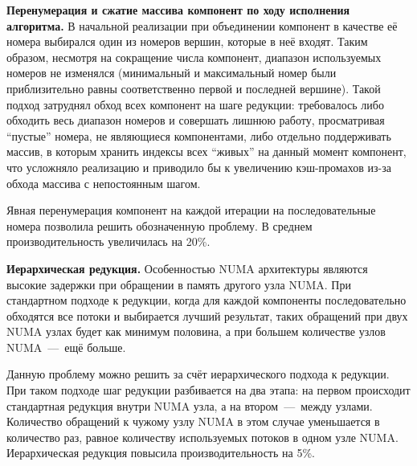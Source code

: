 \documentclass[a4paper,10pt]{extarticle}
\begin{document}
\textbf{Перенумерация и сжатие массива компонент по ходу исполнения алгоритма.}
В начальной реализации при объединении компонент в качестве её номера выбирался один из номеров вершин, которые в неё входят. Таким образом, несмотря на сокращение числа компонент, диапазон используемых номеров не изменялся (минимальный и максимальный номер были приблизительно равны соответственно первой и последней вершине). Такой подход затруднял обход всех компонент на шаге редукции: требовалось либо обходить весь диапазон номеров и совершать лишнюю работу, просматривая ``пустые'' номера, не являющиеся компонентами, либо отдельно поддерживать массив, в которым хранить индексы всех ``живых'' на данный момент компонент, что усложняло реализацию и приводило бы к увеличению кэш-промахов из-за обхода массива с непостоянным шагом.

Явная перенумерация компонент на каждой итерации на последовательные номера позволила решить обозначенную проблему. В среднем производительность увеличилась на 20\%.


\textbf{Иерархическая редукция.}
Особенностью NUMA архитектуры являются высокие задержки при обращении в память другого узла NUMA.
При стандартном подходе к редукции, когда для каждой компоненты последовательно обходятся все потоки и выбирается лучший результат, таких обращений при двух NUMA узлах будет как минимум половина, а при большем количестве узлов NUMA~---~ещё больше. 

Данную проблему можно решить за счёт иерархического подхода к редукции. При таком подходе шаг редукции разбивается на два этапа: на первом происходит стандартная редукция внутри NUMA узла, а на втором~---~между узлами. Количество обращений к чужому узлу NUMA в этом случае уменьшается в количество раз, равное количеству используемых потоков в одном узле NUMA. Иерархическая редукция повысила производительность на 5\%.
\end{document}
